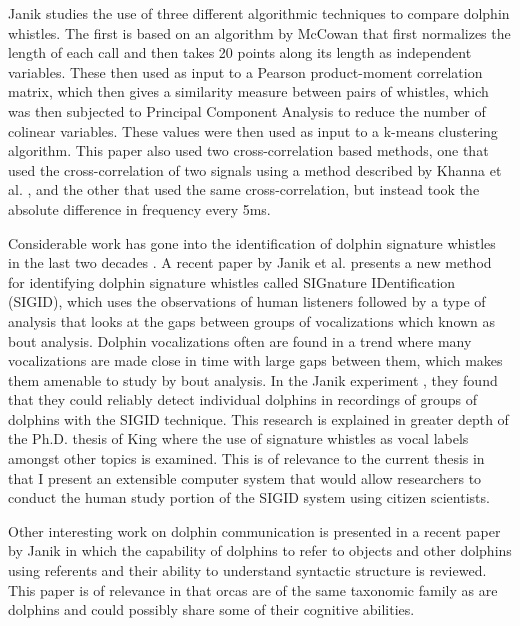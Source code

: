 \documentclass[12pt,oneside]{book}
\begin{document}
Janik \cite{janik1999pitfalls} studies the use of three different
algorithmic techniques to compare dolphin whistles.  The first is
based on an algorithm by McCowan \cite{mccowan1995quantitative} that
first normalizes the length of each call and then takes 20 points
along its length as independent variables.  These then used as input
to a Pearson product-moment correlation matrix, which then gives a
similarity measure between pairs of whistles, which was then subjected
to Principal Component Analysis to reduce the number of colinear
variables.  These values were then used as input to a k-means
clustering algorithm.  This paper also used two cross-correlation
based methods, one that used the cross-correlation of two signals using
a method described by Khanna et al. \cite{khanna1997crosscorrelation},
and the other that used the same cross-correlation, but instead took
the absolute difference in frequency every 5ms.

Considerable work has gone into the identification of dolphin
signature whistles in the last two decades \cite{sayigh1990signature}.
A recent paper by Janik et al. \cite{janik2013signature} presents a
new method for identifying dolphin signature whistles called SIGnature
IDentification (SIGID), which uses the observations of human listeners
followed by a type of analysis that looks at the gaps between groups
of vocalizations which known as bout
analysis\cite{slater1982minimising}.  Dolphin vocalizations often are
found in a trend where many vocalizations are made close in time with
large gaps between them, which makes them amenable to study by bout
analysis.  In the Janik experiment \cite{janik2013signature}, they
found that they could reliably detect individual dolphins in
recordings of groups of dolphins with the SIGID technique.  This
research is explained in greater depth of the Ph.D. thesis of King
\cite{king2012imitation} where the use of signature whistles as vocal
labels amongst other topics is examined.  This is of relevance to the
current thesis in that I present an extensible computer system that
would allow researchers to conduct the human study portion of the
SIGID system using citizen scientists.

Other interesting work on dolphin communication is presented in a
recent paper by Janik \cite{janik2013cognitive} in which the
capability of dolphins to refer to objects and other dolphins using
referents and their ability to understand syntactic structure is
reviewed.  This paper is of relevance in that orcas are of the same
taxonomic family as are dolphins and could possibly share some of
their cognitive abilities.
\end{document}
